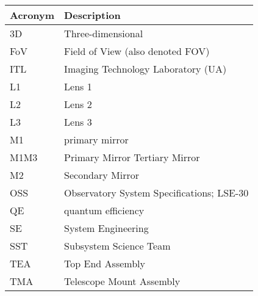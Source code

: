 \addtocounter{table}{-1}
\begin{longtable}{p{}p{}}\hline
\textbf{Acronym} & \textbf{Description}  \\\hline

3D & Three-dimensional \\\hline
FoV & Field of View (also denoted FOV) \\\hline
ITL & Imaging Technology Laboratory (UA) \\\hline
L1 & Lens 1 \\\hline
L2 & Lens 2 \\\hline
L3 & Lens 3 \\\hline
M1 & primary mirror \\\hline
M1M3 & Primary Mirror Tertiary Mirror \\\hline
M2 & Secondary Mirror \\\hline
OSS & Observatory System Specifications; LSE-30 \\\hline
QE & quantum efficiency \\\hline
SE & System Engineering \\\hline
SST & Subsystem Science Team \\\hline
TEA & Top End Assembly \\\hline
TMA & Telescope Mount Assembly \\\hline
\end{longtable}
